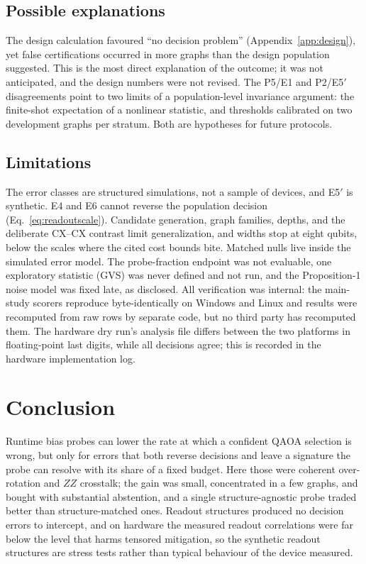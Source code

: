 \documentclass[10pt,twocolumn]{article}
\begin{document}
\subsection{Possible explanations}

The design calculation favoured ``no decision problem''
(Appendix~\ref{app:design}), yet false certifications occurred in more graphs
than the design population suggested. This is the most direct explanation of
the outcome; it was not anticipated, and the design numbers were not revised.
The P5/E1 and P2/E5$'$ disagreements point to two limits of a population-level
invariance argument: the finite-shot expectation of a nonlinear statistic, and
thresholds calibrated on two development graphs per stratum. Both are
hypotheses for future protocols.

\subsection{Limitations}

The error classes are structured simulations, not a sample of devices, and
E5$'$ is synthetic. E4 and E6 cannot reverse the population decision
(Eq.~\eqref{eq:readoutscale}). Candidate generation, graph families, depths,
and the deliberate CX--CX contrast limit generalization, and widths stop at
eight qubits, below the scales where the cited cost bounds bite. Matched nulls
live inside the simulated error model. The probe-fraction endpoint was not
evaluable, one exploratory statistic (GVS) was never defined and not run, and
the Proposition-1 noise model was fixed late, as disclosed. All verification
was internal: the main-study scorers reproduce byte-identically on Windows and
Linux and results were recomputed from raw rows by separate code, but no third
party has recomputed them. The hardware dry run's analysis file differs between
the two platforms in floating-point last digits, while all decisions agree; this
is recorded in the hardware implementation log.

\section{Conclusion}

Runtime bias probes can lower the rate at which a confident QAOA selection is
wrong, but only for errors that both reverse decisions and leave a signature
the probe can resolve with its share of a fixed budget. Here those were
coherent over-rotation and $ZZ$ crosstalk; the gain was small, concentrated in
a few graphs, and bought with substantial abstention, and a single
structure-agnostic probe traded better than structure-matched ones. Readout
structures produced no decision errors to intercept, and on hardware the
measured readout correlations were far below the level that harms tensored
mitigation, so the synthetic readout structures are stress tests rather than
typical behaviour of the device measured.
\end{document}
